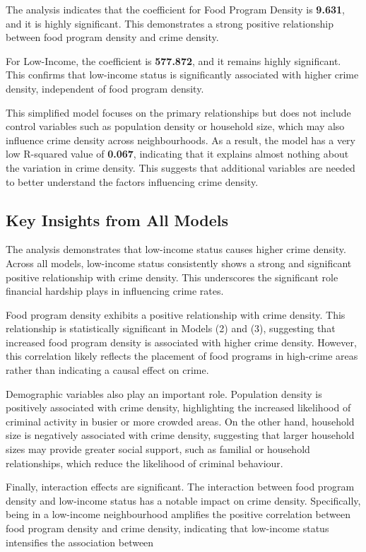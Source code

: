 \documentclass[AEJ]{AEA}
\begin{document}
The analysis indicates that the coefficient for Food Program Density is \textbf{9.631}, and it is highly significant. This demonstrates a strong positive relationship between food program density and crime density.

For Low-Income, the coefficient is \textbf{577.872}, and it remains highly significant. This confirms that low-income status is significantly associated with higher crime density, independent of food program density.

This simplified model focuses on the primary relationships but does not include control variables such as population density or household size, which may also influence crime density across neighbourhoods. As a result, the model has a very low R-squared value of \textbf{0.067}, indicating that it explains almost nothing about the variation in crime density. This suggests that additional variables are needed to better understand the factors influencing crime density.

\subsection{Key Insights from All Models}

The analysis demonstrates that low-income status causes higher crime density. Across all models, low-income status consistently shows a strong and significant positive relationship with crime density. This underscores the significant role financial hardship plays in influencing crime rates.

Food program density exhibits a positive relationship with crime density. This relationship is statistically significant in Models (2) and (3), suggesting that increased food program density is associated with higher crime density. However, this correlation likely reflects the placement of food programs in high-crime areas rather than indicating a causal effect on crime.

Demographic variables also play an important role. Population density is positively associated with crime density, highlighting the increased likelihood of criminal activity in busier or more crowded areas. On the other hand, household size is negatively associated with crime density, suggesting that larger household sizes may provide greater social support, such as familial or household relationships, which reduce the likelihood of criminal behaviour.

Finally, interaction effects are significant. The interaction between food program density and low-income status has a notable impact on crime density. Specifically, being in a low-income neighbourhood amplifies the positive correlation between food program density and crime density, indicating that low-income status intensifies the association between 
\end{document}

